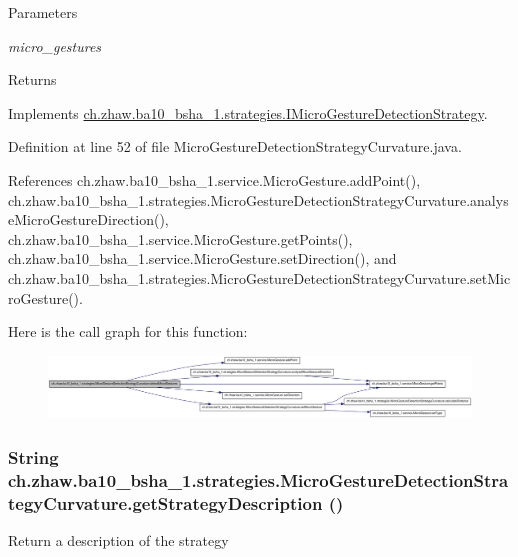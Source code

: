 \begin{DoxyParams}{Parameters}
\item[{\em micro\_\-gestures}]\end{DoxyParams}
\begin{DoxyReturn}{Returns}

\end{DoxyReturn}


Implements \hyperlink{interfacech_1_1zhaw_1_1ba10__bsha__1_1_1strategies_1_1IMicroGestureDetectionStrategy_a8593331fb67e5d4dc890d3db9f2d1b58}{ch.zhaw.ba10\_\-bsha\_\-1.strategies.IMicroGestureDetectionStrategy}.

Definition at line 52 of file MicroGestureDetectionStrategyCurvature.java.

References ch.zhaw.ba10\_\-bsha\_\-1.service.MicroGesture.addPoint(), ch.zhaw.ba10\_\-bsha\_\-1.strategies.MicroGestureDetectionStrategyCurvature.analyseMicroGestureDirection(), ch.zhaw.ba10\_\-bsha\_\-1.service.MicroGesture.getPoints(), ch.zhaw.ba10\_\-bsha\_\-1.service.MicroGesture.setDirection(), and ch.zhaw.ba10\_\-bsha\_\-1.strategies.MicroGestureDetectionStrategyCurvature.setMicroGesture().

Here is the call graph for this function:\nopagebreak
\begin{figure}[H]
\begin{center}
\leavevmode
\includegraphics[width=420pt]{classch_1_1zhaw_1_1ba10__bsha__1_1_1strategies_1_1MicroGestureDetectionStrategyCurvature_a939545a8c5597d693f4857a8f6195fc9_cgraph}
\end{center}
\end{figure}
\hypertarget{classch_1_1zhaw_1_1ba10__bsha__1_1_1strategies_1_1MicroGestureDetectionStrategyCurvature_a78946977e95404053d40384e51b889e2}{
\subsubsection[{getStrategyDescription}]{\setlength{\rightskip}{0pt plus 5cm}String ch.zhaw.ba10\_\-bsha\_\-1.strategies.MicroGestureDetectionStrategyCurvature.getStrategyDescription ()}}
\label{classch_1_1zhaw_1_1ba10__bsha__1_1_1strategies_1_1MicroGestureDetectionStrategyCurvature_a78946977e95404053d40384e51b889e2}
Return a description of the strategy

